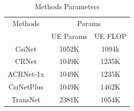 \documentclass[lettersize,journal]{IEEEtran}
\begin{document}
\begin{table}[htb]
	\centering
	\caption{Methods Parameters}
	\label{table:methods_params}
	\begin{tabular}{ c|cc }
		\hline
		\multicolumn{1}{c|}{Methods}      & \multicolumn{2}{c}{Params}     \\
		& \multicolumn{1}{c}{UE Params}             & \multicolumn{1}{c}{UE FLOP} \\
		\hline
		CsiNet     & 1052K      & 1094k \\
		CRNet        & 1049K      & 1235K \\
		ACRNet-1x    & 1049K      & 1235K \\
		CsiNetPlus   & 1049K      & 1462K \\
		TransNet     & 2381K      & 1054K \\
		\hline
	\end{tabular}
\end{table}
\end{document}
